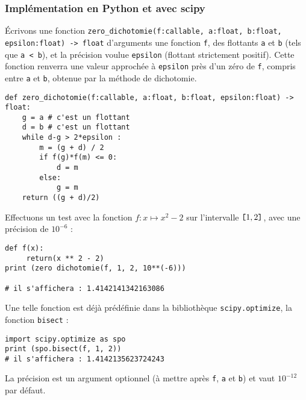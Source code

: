 \subsubsection{Implémentation en Python et avec scipy}
\'Ecrivons une fonction \lstinline{zero_dichotomie(f:callable, a:float, b:float, epsilon:float) -> float} d'arguments une fonction \lstinline{f}, des flottants \lstinline{a} et \lstinline{b} (tels que \lstinline{a < b}), et  la précision voulue \lstinline{epsilon} (flottant strictement positif). Cette fonction renverra une valeur approchée à \lstinline{epsilon} près d'un zéro de \lstinline{f}, compris entre \lstinline{a} et \lstinline{b}, obtenue par la méthode de dichotomie.

\begin{lstlisting}
def zero_dichotomie(f:callable, a:float, b:float, epsilon:float) -> float:
    g = a # c'est un flottant
    d = b # c'est un flottant
    while d-g > 2*epsilon :
        m = (g + d) / 2
        if f(g)*f(m) <= 0:
            d = m
        else:
            g = m
    return ((g + d)/2)
\end{lstlisting}

Effectuons un test avec la fonction $f : x \mapsto x^2-2$ sur l'intervalle $\verb![!1,2\verb!]!$, avec une précision de $10^{-6}$ :
 
\begin{lstlisting}
def f(x):
     return(x ** 2 - 2)
print (zero dichotomie(f, 1, 2, 10**(-6)))

# il s'affichera : 1.4142141342163086
\end{lstlisting}
%
% 

Une telle fonction est déjà prédéfinie dans la bibliothèque \lstinline{scipy.optimize}, la fonction \lstinline{bisect} : 
\begin{lstlisting}
import scipy.optimize as spo
print (spo.bisect(f, 1, 2)) 
# il s'affichera : 1.4142135623724243
\end{lstlisting}
La précision est un argument optionnel (à mettre après \lstinline{f}, \lstinline{a} et \lstinline{b}) et vaut $10^{-12}$ par défaut.

